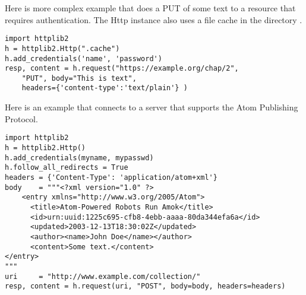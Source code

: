 Here is more complex example that does a PUT 
of some text to a resource that requires authentication.
The Http instance also uses a file cache
in the directory . 

\begin{verbatim}
import httplib2
h = httplib2.Http(".cache")
h.add_credentials('name', 'password')
resp, content = h.request("https://example.org/chap/2", 
    "PUT", body="This is text", 
    headers={'content-type':'text/plain'} )
\end{verbatim}

Here is an example that connects to a server that 
supports the Atom Publishing Protocol.

\begin{verbatim}
import httplib2
h = httplib2.Http()
h.add_credentials(myname, mypasswd)
h.follow_all_redirects = True
headers = {'Content-Type': 'application/atom+xml'}
body    = """<?xml version="1.0" ?>
    <entry xmlns="http://www.w3.org/2005/Atom">
      <title>Atom-Powered Robots Run Amok</title>
      <id>urn:uuid:1225c695-cfb8-4ebb-aaaa-80da344efa6a</id>
      <updated>2003-12-13T18:30:02Z</updated>
      <author><name>John Doe</name></author>
      <content>Some text.</content>
</entry>
"""
uri     = "http://www.example.com/collection/"
resp, content = h.request(uri, "POST", body=body, headers=headers)
\end{verbatim}


